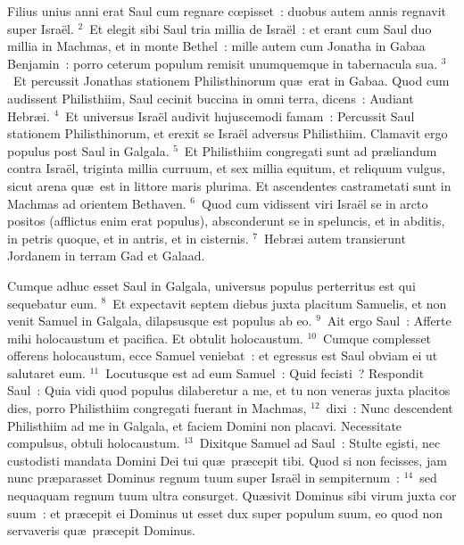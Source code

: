 \lettrine[lines=10,image=true,loversize=0.05,lraise=-0.03]{F}{}ilius unius anni erat Saul cum regnare cœpisset~: duobus autem annis regnavit super Isra\"el.
${}^{2}$~Et elegit sibi Saul tria millia de Isra\"el~: et erant cum Saul duo millia in Machmas, et in monte Bethel~: mille autem cum Jonatha in Gabaa Benjamin~: porro ceterum populum remisit unumquemque in tabernacula sua.
${}^{3}$~Et percussit Jonathas stationem Philisthinorum qu\ae\ erat in Gabaa. Quod cum audissent Philisthiim, Saul cecinit buccina in omni terra, dicens~: Audiant Hebr\ae i.
${}^{4}$~Et universus Isra\"el audivit hujuscemodi famam~: Percussit Saul stationem Philisthinorum, et erexit se Isra\"el adversus Philisthiim. Clamavit ergo populus post Saul in Galgala.
${}^{5}$~Et Philisthiim congregati sunt ad pr\ae liandum contra Isra\"el, triginta millia curruum, et sex millia equitum, et reliquum vulgus, sicut arena qu\ae\ est in littore maris plurima. Et ascendentes castrametati sunt in Machmas ad orientem Bethaven.
${}^{6}$~Quod cum vidissent viri Isra\"el se in arcto positos (afflictus enim erat populus), absconderunt se in speluncis, et in abditis, in petris quoque, et in antris, et in cisternis.
${}^{7}$~Hebr\ae i autem transierunt Jordanem in terram Gad et Galaad.

 Cumque adhuc esset Saul in Galgala, universus populus perterritus est qui sequebatur eum.
${}^{8}$~Et expectavit septem diebus juxta placitum Samuelis, et non venit Samuel in Galgala, dilapsusque est populus ab eo.
${}^{9}$~Ait ergo Saul~: Afferte mihi holocaustum et pacifica. Et obtulit holocaustum.
${}^{10}$~Cumque complesset offerens holocaustum, ecce Samuel veniebat~: et egressus est Saul obviam ei ut salutaret eum.
${}^{11}$~Locutusque est ad eum Samuel~: Quid fecisti~? Respondit Saul~: Quia vidi quod populus dilaberetur a me, et tu non veneras juxta placitos dies, porro Philisthiim congregati fuerant in Machmas,
${}^{12}$~dixi~: Nunc descendent Philisthiim ad me in Galgala, et faciem Domini non placavi. Necessitate compulsus, obtuli holocaustum.
${}^{13}$~Dixitque Samuel ad Saul~: Stulte egisti, nec custodisti mandata Domini Dei tui qu\ae\ pr\ae cepit tibi. Quod si non fecisses, jam nunc pr\ae parasset Dominus regnum tuum super Isra\"el in sempiternum~:
${}^{14}$~sed nequaquam regnum tuum ultra consurget. Qu\ae sivit Dominus sibi virum juxta cor suum~: et pr\ae cepit ei Dominus ut esset dux super populum suum, eo quod non servaveris qu\ae\ pr\ae cepit Dominus.


